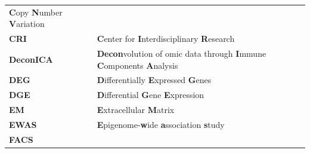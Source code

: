 \documentclass[12pt,]{book}
\theoremstyle{definition}
\theoremstyle{definition}
\theoremstyle{definition}
\theoremstyle{remark}
\begin{document}
\begin{longtable}[]{@{}ll@{}}
\begin{minipage}[t]{0.80\columnwidth}
\textbf{C}opy \textbf{N}umber \textbf{V}ariation\strut
\end{minipage}\tabularnewline
\begin{minipage}[t]{0.14\columnwidth}\raggedright
\textbf{CRI}\strut
\end{minipage} & \begin{minipage}[t]{0.80\columnwidth}\raggedright
\textbf{C}enter for \textbf{I}nterdisciplinary \textbf{R}esearch\strut
\end{minipage}\tabularnewline
\begin{minipage}[t]{0.14\columnwidth}\raggedright
\textbf{DeconICA}\strut
\end{minipage} & \begin{minipage}[t]{0.80\columnwidth}\raggedright
\textbf{Decon}volution of omic data through \textbf{I}mmune
\textbf{C}omponents \textbf{A}nalysis\strut
\end{minipage}\tabularnewline
\begin{minipage}[t]{0.14\columnwidth}\raggedright
\textbf{DEG}\strut
\end{minipage} & \begin{minipage}[t]{0.80\columnwidth}\raggedright
\textbf{D}ifferentially \textbf{E}xpressed \textbf{G}enes\strut
\end{minipage}\tabularnewline
\begin{minipage}[t]{0.14\columnwidth}\raggedright
\textbf{DGE}\strut
\end{minipage} & \begin{minipage}[t]{0.80\columnwidth}\raggedright
\textbf{D}ifferential \textbf{G}ene \textbf{E}xpression\strut
\end{minipage}\tabularnewline
\begin{minipage}[t]{0.14\columnwidth}\raggedright
\textbf{EM}\strut
\end{minipage} & \begin{minipage}[t]{0.80\columnwidth}\raggedright
\textbf{E}xtracellular \textbf{M}atrix\strut
\end{minipage}\tabularnewline
\begin{minipage}[t]{0.14\columnwidth}\raggedright
\textbf{EWAS}\strut
\end{minipage} & \begin{minipage}[t]{0.80\columnwidth}\raggedright
\textbf{E}pigenome-\textbf{w}ide \textbf{a}ssociation
\textbf{s}tudy\strut
\end{minipage}\tabularnewline
\begin{minipage}[t]{0.14\columnwidth}\raggedright
\textbf{FACS}\strut

\end{minipage}
\end{longtable}
\end{document}
